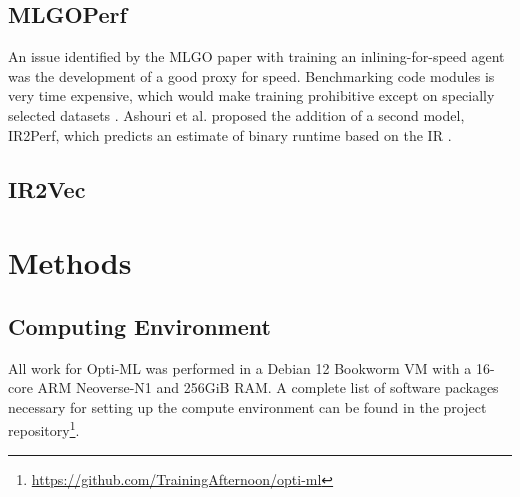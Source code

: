 \documentclass[nohyperref]{article}
\theoremstyle{plain}
\theoremstyle{definition}
\theoremstyle{remark}
\begin{document}



\subsection{MLGOPerf}
An issue identified by the MLGO paper with training an inlining-for-speed agent was the development of a good proxy for speed. Benchmarking code modules is very time expensive, which would make training prohibitive except on specially selected datasets \cite{mlgo}. Ashouri et al. proposed the addition of a second model, IR2Perf, which predicts an estimate of binary runtime based on the IR \cite{mlgoperf}.

\subsection{IR2Vec}

\section{Methods}
\label{methods}
\subsection{Computing Environment}
All work for Opti-ML was performed in a Debian 12 Bookworm VM with a 16-core ARM Neoverse-N1 and 256GiB RAM. A complete list of software packages necessary for setting up the compute environment can be found in the project repository\footnote{\href{https://github.com/TrainingAfternoon/opti-ml}{https://github.com/TrainingAfternoon/opti-ml}}.
\end{document}
